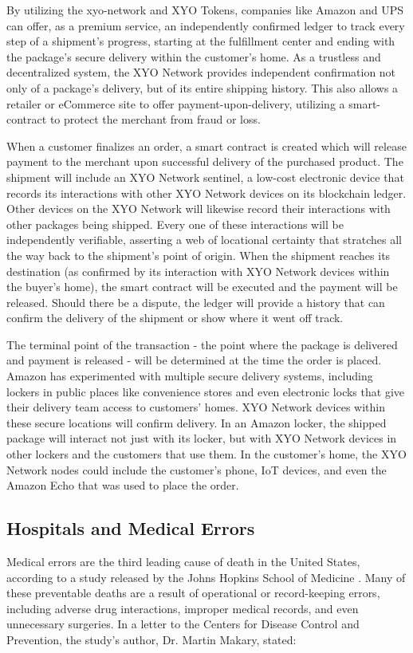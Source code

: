 \documentclass{article}
\begin{document}
By utilizing the \Gls{xyo-network} and XYO Tokens, companies like Amazon and UPS can offer, as a premium service, an independently confirmed ledger to track every step of a shipment's progress, starting at the fulfillment center and ending with the package's secure delivery within the customer's home. As a \gls{trustless} and decentralized system, the XYO Network provides independent confirmation not only of a package's delivery, but of its entire shipping history. This also allows a retailer or eCommerce site to offer payment-upon-delivery, utilizing a \gls{smart-contract} to protect the merchant from fraud or loss.

When a customer finalizes an order, a smart contract is created which will release payment to the merchant upon successful delivery of the purchased product. The shipment will include an XYO Network \Gls{sentinel}, a low-cost electronic device that records its interactions with other XYO Network devices on its blockchain ledger. Other devices on the XYO Network will likewise record their interactions with other packages being shipped. Every one of these interactions will be independently verifiable, asserting a web of locational \gls{certainty} that stratches all the way back to the shipment's point of origin. When the shipment reaches its destination (as confirmed by its interaction with XYO Network devices within the buyer's home), the smart contract will be executed and the payment will be released. Should there be a dispute, the ledger will provide a history that can confirm the delivery of the shipment or show where it went off track.

The terminal point of the transaction - the point where the package is delivered and payment is released - will be determined at the time the order is placed. Amazon has experimented with multiple secure delivery systems, including lockers in public places like convenience stores and even electronic locks that give their delivery team access to customers' homes. XYO Network devices within these secure locations will confirm delivery. In an Amazon locker, the shipped package will interact not just with its locker, but with XYO Network devices in other lockers and the customers that use them. In the customer's home, the XYO Network nodes could include the customer's phone, IoT devices, and even the Amazon Echo that was used to place the order.

\subsection{Hospitals and Medical Errors}
Medical errors are the third leading cause of death in the United States, according to a study released by the Johns Hopkins School of Medicine \cite{makary-medicalerrors}. Many of these preventable deaths are a result of operational or record-keeping errors, including adverse drug interactions, improper medical records, and even unnecessary surgeries. In a letter to the Centers for Disease Control and Prevention, the study's author, Dr. Martin Makary, stated:
\end{document}
